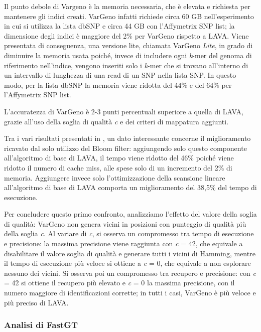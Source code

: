 \documentclass[../main.tex]{subfiles}
\begin{document}
Il punto debole di Vargeno è la memoria necessaria, che è elevata e richiesta per mantenere gli indici creati. VarGeno infatti richiede circa 60 GB nell'esperimento in cui si utilizza la lista dbSNP e circa 44 GB con l'Affymetrix SNP list; la dimensione degli indici è maggiore del 2\% per VarGeno rispetto a LAVA. Viene presentata di conseguenza, una versione lite, chiamata VarGeno \textit{Lite}, in grado di diminuire la memoria usata poiché, invece di includere ogni \textit{k}-mer del genoma di riferimento nell'indice, vengono inseriti solo i \textit{k}-mer che si trovano all'interno di un intervallo di lunghezza di una read di un SNP nella lista SNP. In questo modo, per la lista dbSNP la memoria viene ridotta del 44\% e del 64\% per l'Affymetrix SNP list.

L'accuratezza di VarGeno è 2-3 punti percentuali superiore a quella di LAVA, grazie all'uso della soglia di qualità \textit{c} e dei criteri di mappatura aggiunti. 

Tra i vari risultati presentati in \cite{sun-medvedev2018vargeno}, un dato interessante concerne il miglioramento ricavato dal solo utilizzo del Bloom filter: aggiungendo solo questo componente all'algoritmo di base di LAVA, il tempo viene ridotto del 46\% poiché viene ridotto il numero di cache miss, alle spese solo di un incremento del 2\% di memoria. Aggiungere invece solo l'ottimizzazione della scansione lineare all'algoritmo di base di LAVA comporta un miglioramento del 38,5\% del tempo di esecuzione. 

Per concludere questo primo confronto, analizziamo l'effetto del valore della soglia di qualità: VarGeno non genera vicini in posizioni con punteggio di qualità più della soglia \textit{c}. Al variare di \textit{c}, si osserva un compromesso tra tempo di esecuzione e precisione: la massima precisione viene raggiunta con \textit{c} = 42, che equivale a disabilitare il valore soglia di qualità e generare tutti i vicini di Hamming, mentre il tempo di esecuzione più veloce si ottiene a \textit{c} = 0, che equivale a non esplorare nessuno dei vicini. Si osserva poi un compromesso tra recupero e precisione: con \textit{c} = 42 si ottiene il recupero più elevato e \textit{c} = 0 la massima precisione, con il numero maggiore di identificazioni corrette; in tutti i casi, VarGeno è più veloce e più preciso di LAVA. 


\subsubsection{Analisi di FastGT}
\end{document}
